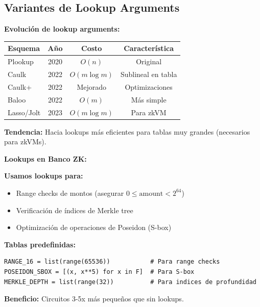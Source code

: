 \documentclass[11pt,a4paper,twoside]{book}
\begin{document}
\subsection{Variantes de Lookup Arguments}

\begin{remark}
\textbf{Evoluci\'on de lookup arguments:}

\begin{center}
\begin{tabular}{lccc}
\toprule
\textbf{Esquema} & \textbf{A\~no} & \textbf{Costo} & \textbf{Caracter\'istica} \\
\midrule
Plookup & 2020 & $O(n)$ & Original \\
Caulk & 2022 & $O(m \log m)$ & Sublineal en tabla \\
Caulk+ & 2022 & Mejorado & Optimizaciones \\
Baloo & 2022 & $O(m)$ & M\'as simple \\
Lasso/Jolt & 2023 & $O(m \log m)$ & Para zkVM \\
\bottomrule
\end{tabular}
\end{center}

\textbf{Tendencia:} Hacia lookups m\'as eficientes para tablas muy grandes (necesarios para zkVMs).
\end{remark}

\begin{bancozk}
\textbf{Lookups en Banco ZK:}

\textbf{Usamos lookups para:}
\begin{itemize}
    \item Range checks de montos (asegurar $0 \leq \text{amount} < 2^{64}$)
    \item Verificaci\'on de \'indices de Merkle tree
    \item Optimizaci\'on de operaciones de Poseidon (S-box)
\end{itemize}

\textbf{Tablas predefinidas:}
\begin{lstlisting}[style=python]
RANGE_16 = list(range(65536))           # Para range checks
POSEIDON_SBOX = [(x, x**5) for x in F]  # Para S-box
MERKLE_DEPTH = list(range(32))          # Para indices de profundidad
\end{lstlisting}

\textbf{Beneficio:} Circuitos 3-5x m\'as peque\~nos que sin lookups.
\end{bancozk}
\end{document}
